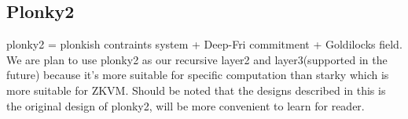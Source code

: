 \subsection{Plonky2} \label{sec:Plonky2}

plonky2 = plonkish contraints system + Deep-Fri commitment + Goldilocks field. We are plan to use plonky2 as our recursive layer2 and layer3(supported in the future) because it's more suitable
for specific computation than starky which is more suitable for ZKVM. Should be noted that the designs described in this is the original design of plonky2, will be more convenient to learn for
reader.






